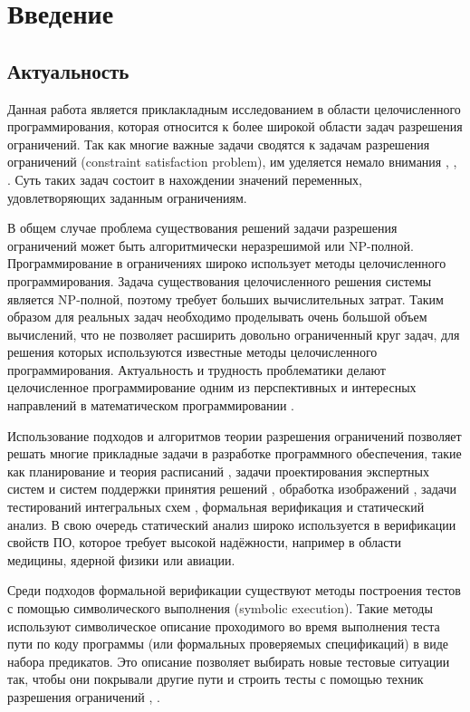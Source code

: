\documentclass[a4paper,14pt,russian]{extreport}
\begin{document}
\newpage
\chapter{Введение}
\section{Актуальность}
Данная работа является приклакладным исследованием в области целочисленного программирования, которая относится к более широкой области задач разрешения ограничений. Так как многие важные задачи сводятся к задачам разрешения ограничений (constraint satisfaction problem), им уделяется немало внимания \cite{dechter}, \cite{freuder}, \cite{tsang}. Суть таких задач состоит в нахождении значений переменных, удовлетворяющих заданным ограничениям. 
\par
В общем случае проблема существования решений задачи разрешения ограничений может быть алгоритмически неразрешимой или NP-полной. Программирование в ограничениях широко использует методы целочисленного программирования. Задача существования целочисленного решения системы является NP-полной, поэтому требует больших вычислительных затрат. Таким образом для реальных задач необходимо проделывать очень большой объем вычислений, что не позволяет расширить довольно ограниченный круг задач, для решения которых используются известные методы целочисленного программирования. Актуальность и трудность проблематики делают целочисленное программирование одним из перспективных и интересных направлений в математическом программировании \cite{karmanov}\cite {balinski}.
\par
Использование подходов и алгоритмов теории разрешения ограничений позволяет решать многие прикладные задачи в разработке программного обеспечения, такие как планирование \cite{kautz} и теория расписаний \cite{barnier}, задачи проектирования экспертных систем и систем поддержки принятия решений \cite{saraev}, обработка изображений \cite{montanari}, задачи тестирований интегральных схем \cite{hooker}, формальная верификация и статический анализ. В свою очередь статический анализ широко используется в верификации свойств ПО, которое требует высокой надёжности, например в области медицины, ядерной физики или авиации.
\par
Среди подходов формальной верификации существуют методы построения тестов с помощью символического выполнения (symbolic execution). Такие методы используют символическое описание проходимого во время выполнения теста пути по коду программы (или формальных проверяемых спецификаций) в виде набора предикатов. Это описание позволяет выбирать новые тестовые ситуации так, чтобы они покрывали другие пути и строить тесты с помощью техник разрешения ограничений \cite{gotlieb}, \cite{boyapati}. 
\end{document}

